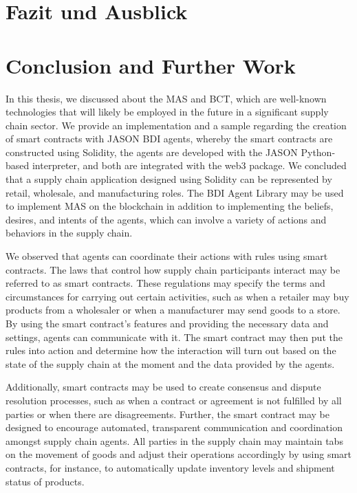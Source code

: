 {\chapter{Fazit und Ausblick}}
{\chapter{Conclusion and Further Work}}

\label{sec:conclusion}

In this thesis, we discussed about the \ac{MAS} and \ac{BCT}, which are well-known technologies that will likely be employed in the future in a significant supply chain sector. We provide an implementation and a sample regarding the creation of smart contracts with JASON \ac{BDI} agents, whereby the smart contracts are constructed using Solidity, the agents are developed with the JASON Python-based interpreter, and both are integrated with the web3 package. We concluded that a supply chain application designed using Solidity can be represented by retail, wholesale, and manufacturing roles. The \ac{BDI} Agent Library may be used to implement \ac{MAS} on the blockchain in addition to implementing the beliefs, desires, and intents of the agents, which can involve a variety of actions and behaviors in the supply chain.

\vspace{.5cm}

We observed that agents can coordinate their actions with rules using smart contracts. The laws that control how supply chain participants interact may be referred to as smart contracts. These regulations may specify the terms and circumstances for carrying out certain activities, such as when a retailer may buy products from a wholesaler or when a manufacturer may send goods to a store. By using the smart contract's features and providing the necessary data and settings, agents can communicate with it. The smart contract may then put the rules into action and determine how the interaction will turn out based on the state of the supply chain at the moment and the data provided by the agents.

\vspace{.5cm}

Additionally, smart contracts may be used to create consensus and dispute resolution processes, such as when a contract or agreement is not fulfilled by all parties or when there are disagreements. Further, the smart contract may be designed to encourage automated, transparent communication and coordination amongst supply chain agents. All parties in the supply chain may maintain tabs on the movement of goods and adjust their operations accordingly by using smart contracts, for instance, to automatically update inventory levels and shipment status of products.


